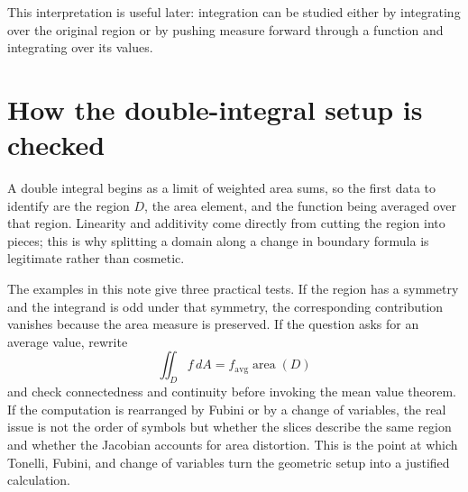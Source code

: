 This interpretation is useful later: integration can be studied either by integrating over the original region or by pushing measure forward through a function and integrating over its values.

\section{How the double-integral setup is checked}

A double integral begins as a limit of weighted area sums, so the first data to identify are the region \(D\), the area element, and the function being averaged over that region.  Linearity and additivity come directly from cutting the region into pieces; this is why splitting a domain along a change in boundary formula is legitimate rather than cosmetic.

The examples in this note give three practical tests.  If the region has a symmetry and the integrand is odd under that symmetry, the corresponding contribution vanishes because the area measure is preserved.  If the question asks for an average value, rewrite
\[
  \iint_D f\,dA= f_{\mathrm{avg}}\operatorname{area}(D)
\]
and check connectedness and continuity before invoking the mean value theorem.  If the computation is rearranged by Fubini or by a change of variables, the real issue is not the order of symbols but whether the slices describe the same region and whether the Jacobian accounts for area distortion.  This is the point at which Tonelli, Fubini, and change of variables turn the geometric setup into a justified calculation.

